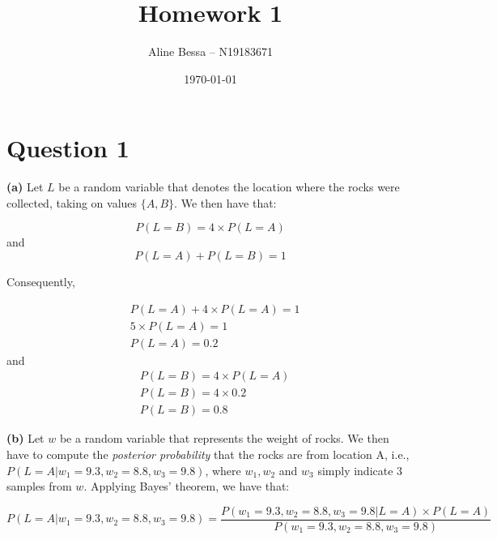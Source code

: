 \documentclass[leqno]{article}
\title{Homework 1}
\author{Aline Bessa -- N19183671}
\date\today
\begin{document}
\maketitle %

\section*{Question 1}

\textbf{(a)} Let $L$ be a random variable that denotes the location where the rocks were collected, taking on values $\{A, B\}$. We then have that:

\begin{equation*}
P(L = B) = 4 \times P(L = A)
\end{equation*}
and
\begin{equation*}
P(L = A) + P(L = B) = 1 
\end{equation*}

\noindent Consequently, 

\begin{equation*}
\begin{split}
&P(L = A) + 4 \times P(L = A) = 1\\
&5 \times P(L = A) = 1\\
&P(L = A) = 0.2
\end{split}
\end{equation*}
and
\begin{equation*}
\begin{split}
&P(L = B) = 4 \times P(L = A) \\
&P(L = B) = 4 \times 0.2 \\
&P(L = B) = 0.8
\end{split}
\end{equation*}

\hfill

\noindent \textbf{(b)} Let $w$ be a random variable that represents the weight of rocks. We then have to compute the \textit{posterior probability} that the rocks are from 
location A, i.e., $P(L = A| w_1 = 9.3, w_2 = 8.8, w_3 = 9.8)$, where $w_1, w_2$ and $w_3$ simply indicate 3 samples from $w$. Applying Bayes' theorem, we have that:

\begin{equation}
P(L = A| w_1 = 9.3, w_2 = 8.8, w_3 = 9.8) = \frac{P(w_1 = 9.3, w_2 = 8.8, w_3 = 9.8| L = A) \times P(L = A)}{P(w_1 = 9.3, w_2 = 8.8, w_3 = 9.8)}
\label{eq1}
\end{equation}
\end{document}
